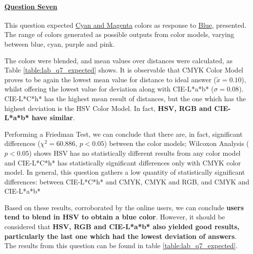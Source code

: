 \paragraph{\ul{Question Seven}}
%
This question expected \ul{Cyan and Magenta} colors as response to \ul{Blue}, presented. The range of colors generated as possible outputs from color models, varying between blue,
cyan, purple and pink. \par
%
The colors were blended, and mean values over distances were calculated, as Table \ref{table:lab_q7_expected} shows. It is observable that CMYK Color Model proves to be again the
lowest mean value for distance to ideal answer ($\tilde{x} = 0.10$), whilst offering the lowest value for deviation along with CIE-L*a*b* ($\sigma = 0.08$). CIE-L*C*h* has the
highest mean result of distances, but the one which has the highest deviation is the HSV Color Model. In fact, \textbf{HSV, RGB and CIE-L*a*b* have similar}. \par
%
Performing a Friedman Test, we can conclude that there are, in fact, significant differences ($\chi^2 = 60.886$, $p < 0.05$) between the color models; Wilcoxon Analysis ($p < 0.05$)
shows HSV has no statistically different results from any color model and CIE-L*C*h* has statistically significant differences only with CMYK color model. In general, this question
gathers a low quantity of statistically significant differences: between CIE-L*C*h* and CMYK, CMYK and RGB, and CMYK and CIE-L*a*b* \par
%
Based on these results, corroborated by the online users, we can conclude \textbf{users tend to blend in HSV to obtain a blue color}. However, it should be considered that \textbf{
HSV, RGB and CIE-L*a*b* also yielded good results, particularly the last one which had the lowest deviation of answers}. The results from this question can be found
in table \ref{table:lab_q7_expected}.
%
